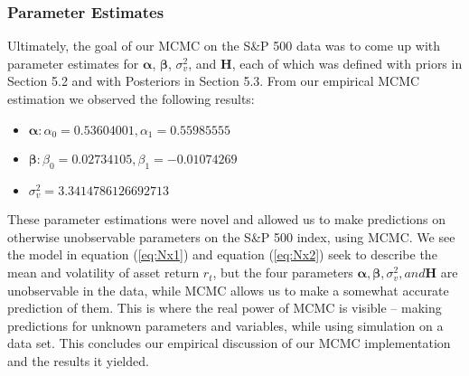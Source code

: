 \documentclass[letterpaper]{article}
\begin{document}
	\subsubsection{Parameter Estimates}
	Ultimately, the goal of our MCMC on the S\&P 500 data was to come up with parameter estimates for $\bm{\alpha}$, $\bm{\beta}$, $\sigma_{v}^2$, and $\bm{H}$, each of which was defined with priors in Section 5.2 and with Posteriors in Section 5.3. From our empirical MCMC estimation we observed the following results:
	\begin{itemize}
		\item $\bm{\alpha}: \alpha_{0} = 0.53604001, \alpha_{1} = 0.55985555$
		\item $\bm{\beta}: \beta_{0} = 0.02734105, \beta_{1} = -0.01074269$
		\item $\sigma_{v}^2 = 3.3414786126692713$
	\end{itemize}
	These parameter estimations were novel and allowed us to make predictions on otherwise unobservable parameters on the S\&P 500 index, using MCMC. We see the model in equation (\ref{eq:Nx1}) and equation (\ref{eq:Nx2}) seek to describe the mean and volatility of asset return $r_t$, but the four parameters $\bm{\alpha}, \bm{\beta}, \sigma_{v}^2, and \bm{H}$ are unobservable in the data, while MCMC allows us to make a somewhat accurate prediction of them. This is where the real power of MCMC is visible -- making predictions for unknown parameters and variables, while using simulation on a data set. This concludes our empirical discussion of our MCMC implementation and the results it yielded. 
	
\end{document}
